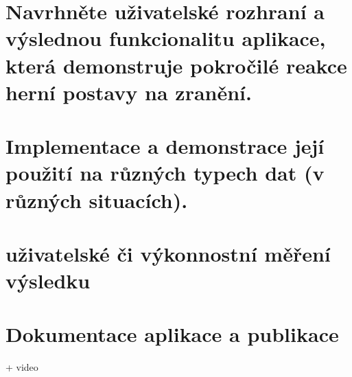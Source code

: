 \chapter{Navrhněte uživatelské rozhraní a výslednou funkcionalitu aplikace, která demonstruje pokročilé reakce herní postavy na zranění.}



\chapter{Implementace a demonstrace její použití na různých typech dat (v různých situacích).}



\chapter{uživatelské či výkonnostní měření výsledku}



\chapter{Dokumentace aplikace a publikace}
+ video
